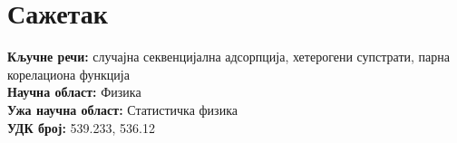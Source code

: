 \normalsize


\sffamily
{}\selectfont

\chapter*{{\selectfont Сажетак}}





\noindent
\textbf{Кључне речи:} случајна секвенцијална адсорпција, хетерогени супстрати,
парна корелациона функција\\
\textbf{Научна област:} Физика \\
\textbf{Ужа научна област:} Статистичка физика \\
\textbf{УДК број:} 539.233, 536.12


\pagebreak

